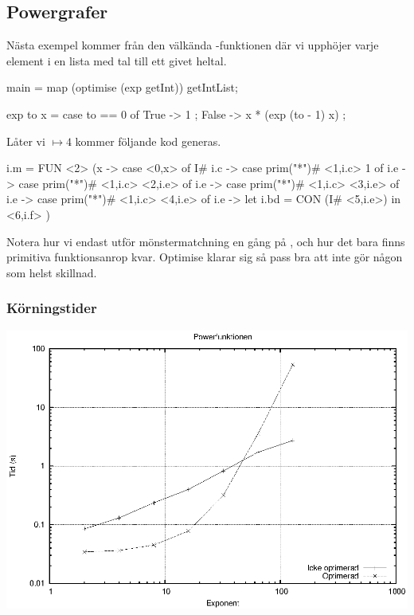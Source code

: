 \documentclass[Rapport]{subfiles}
\begin{document}
\subsection{Powergrafer}
Nästa exempel kommer från den välkända -funktionen där vi upphöjer varje element i en lista med tal till ett givet heltal. 
\begin{codeEx}
main = map (optimise (exp getInt)) getIntList;

exp to x = case to == 0 of
    { True  -> 1
    ; False -> x * (exp (to - 1) x)
    };
\end{codeEx}

Låter vi  $\mapsto 4$ kommer följande kod generas.

\begin{codeEx}
  i.m = FUN <2> (x -> case <0,x> of
    { I# i.c -> case prim("*")# <1,i.c> 1 of
       { {i.e} -> case prim("*")# <1,i.c> <2,i.e> of
          { {i.e} -> case prim("*")# <1,i.c> <3,i.e> of
             { {i.e} -> case prim("*")# <1,i.c> <4,i.e> of
                { {i.e} -> let
                   { i.bd = CON (I# <5,i.e>)
                   } in <6,i.f>
                }
             }
          }
       }
    })
\end{codeEx}

Notera hur vi endast utför mönstermatchning en gång på , och hur det bara finns 
primitiva funktionsanrop kvar. Optimise klarar sig så pass bra att  inte 
gör någon som helst skillnad.


\subsubsection{Körningstider}
\includegraphics{power.eps}
\end{document}
